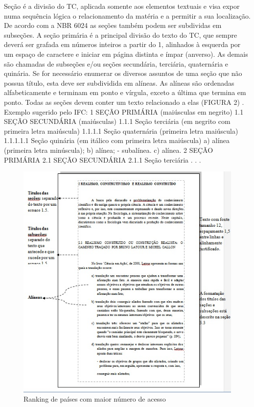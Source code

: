 \documentclass[12pt, openright, oneside, a4paper, brazil]{abntex2}
\begin{document}
Seção é a divisão do TC, aplicada somente aos elementos textuais e visa expor numa sequência lógica o relacionamento da matéria e a permitir a sua localização. De acordo com a NBR 6024 as seções também podem ser subdividas em subseções.
A seção primária é a principal divisão do texto do TC, que sempre deverá ser grafada em números inteiros a partir do 1, alinhados à esquerda por um espaço de caractere e iniciar em página distinta e ímpar (anverso). As demais são chamadas de subseções e/ou seções secundária, terciária, quaternária e quinária. Se for necessário enumerar os diversos assuntos de uma seção que não possua título, esta deve ser subdividida em alíneas. As alíneas são ordenadas alfabeticamente e terminam em ponto e vírgula, exceto a última que termina em ponto. Todas as seções devem conter um texto relacionado a elas (FIGURA 2) .
Exemplo sugerido pelo IFC:
1 SEÇÃO PRIMÁRIA (maiúsculas em negrito)
1.1 SEÇÃO SECUNDÁRIA (maiúsculas)
1.1.1 Seção terciária (em negrito com primeira letra maiúscula)
1.1.1.1 Seção quaternária (primeira letra maiúscula)
1.1.1.1.1 Seção quinária (em itálico com primeira letra maiúscula)
a) alínea (primeira letra minúscula);
b) alínea;
    - subalínea.
c) alínea.
2 SEÇÃO PRIMÁRIA 
2.1 SEÇÃO SECUNDÁRIA 
2.1.1 Seção terciária 
.
.
.
\begin{figure}[htb]
	\caption{\label{ciclo}Ranking de países com maior número de acesso\hspace{10cm}}
	
	\begin{center}
		\includegraphics[scale=1.1]{images/Fig2.jpg}
	\end{center}
	\hspace{5.5cm}{Fonte: Elaboração das Autoras,2014}
\end{figure}
\end{document}
